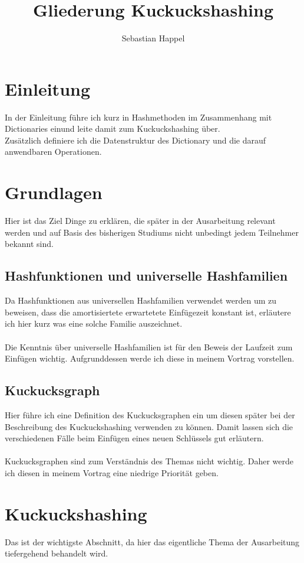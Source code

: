\documentclass{article}
\title{Gliederung Kuckuckshashing}
\author{Sebastian Happel}
\begin{document}
\maketitle

\section{Einleitung}
In der Einleitung führe ich kurz in Hashmethoden im Zusammenhang mit Dictionaries einund leite damit zum Kuckuckshashing über. \\
Zusätzlich definiere ich die Datenstruktur des Dictionary und die darauf anwendbaren Operationen.

\section{Grundlagen}
Hier ist das Ziel Dinge zu erklären, die später in der Ausarbeitung relevant werden und auf Basis des bisherigen Studiums nicht unbedingt jedem Teilnehmer bekannt sind.

\subsection{Hashfunktionen und universelle Hashfamilien}
Da Hashfunktionen aus universellen Hashfamilien verwendet werden um zu beweisen, dass die amortisiertete erwartetete Einfügezeit konstant ist, erläutere ich hier kurz was 
eine solche Familie auszeichnet.
\\ \\
Die Kenntnis über universelle Hashfamilien ist für den Beweis der Laufzeit zum Einfügen wichtig. Aufgrunddessen werde ich diese in meinem Vortrag vorstellen.

\subsection{Kuckucksgraph}
Hier führe ich eine Definition des Kuckucksgraphen ein um diesen später bei der Beschreibung des Kuckuckshashing verwenden zu können. Damit lassen sich die verschiedenen 
Fälle beim Einfügen eines neuen Schlüssels gut erläutern.
\\ \\
Kuckucksgraphen sind zum Verständnis des Themas nicht wichtig. Daher werde ich diesen in meinem Vortrag eine niedrige Priorität geben. 

\section{Kuckuckshashing}
Das ist der wichtigste Abschnitt, da hier das eigentliche Thema der Ausarbeitung tiefergehend behandelt wird.
\end{document}
